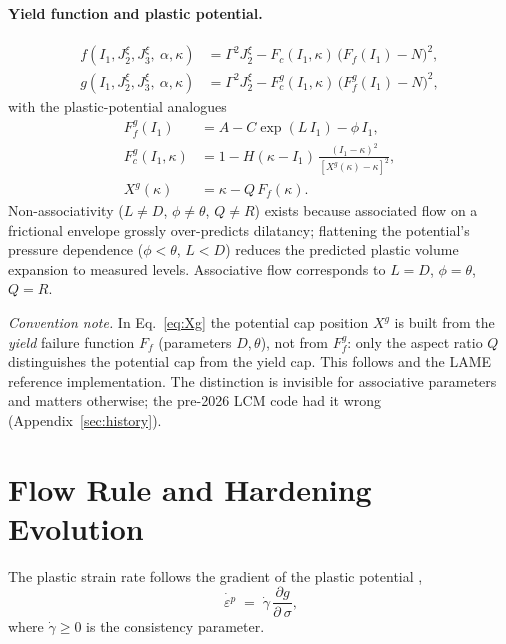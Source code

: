 \documentclass[12pt]{article}
\newcommand{\stress}{~\sigma}
\newcommand{\backstress}{~\alpha}
\newcommand{\pstrain}{{~\varepsilon^p}}
\begin{document}
\paragraph{Yield function and plastic potential.}
\begin{align}
  f(I_1, J_2^\xi, J_3^\xi, \backstress, \kappa)
    &= \Gamma^2 J_2^\xi - F_c(I_1,\kappa)\,\bigl(F_f(I_1) - N\bigr)^2,
    \label{eq:f}\\
  g(I_1, J_2^\xi, J_3^\xi, \backstress, \kappa)
    &= \Gamma^2 J_2^\xi - F_c^g(I_1,\kappa)\,\bigl(F_f^g(I_1) - N\bigr)^2,
    \label{eq:g}
\end{align}
with the plastic-potential analogues
\begin{align}
  F_f^g(I_1)  &= A - C \exp(L\,I_1) - \phi\,I_1, \label{eq:Ffg}\\
  F_c^g(I_1,\kappa) &=
    1 - H(\kappa - I_1)\,\frac{(I_1 - \kappa)^2}{[X^g(\kappa) - \kappa]^2},\\
  X^g(\kappa) &= \kappa - Q\,F_f(\kappa). \label{eq:Xg}
\end{align}
Non-associativity ($L \ne D$, $\phi \ne \theta$, $Q \ne R$) exists
because associated flow on a frictional envelope grossly
over-predicts dilatancy; flattening the potential's pressure
dependence ($\phi < \theta$, $L < D$) reduces the predicted plastic
volume expansion to measured levels. Associative flow corresponds to
$L = D$, $\phi = \theta$, $Q = R$.

\emph{Convention note.} In Eq.~\eqref{eq:Xg} the potential cap
position $X^g$ is built from the \emph{yield} failure function $F_f$
(parameters $D, \theta$), not from $F_f^g$: only the aspect ratio
$Q$ distinguishes the potential cap from the yield cap. This follows
\citet[Eq.~14]{Regueiro.Foster:2011} and the LAME reference
implementation. The distinction is invisible for associative
parameters and matters otherwise; the pre-2026 LCM code had it wrong
(Appendix~\ref{sec:history}).

\section{Flow Rule and Hardening Evolution}
\label{sec:flow}

The plastic strain rate follows the gradient of the plastic
potential \citep[Eq.~48]{Sun.Chen.Ostien:2014},
\begin{equation}
  \dot{\pstrain} \;=\; \dot\gamma\,\frac{\partial g}{\partial \stress},
  \label{eq:flow}
\end{equation}
where $\dot\gamma \ge 0$ is the consistency parameter.
\end{document}
